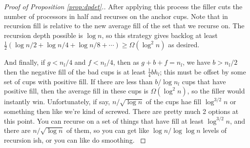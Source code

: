 \documentclass{article}[11pt]
\begin{document}
\begin{proof}[Proof of Proposition \ref{prop:dpdet}.]
  After applying this process the filler cuts the number of processors in half
  and recurses on the anchor cups. Note that in recursion fill is relative to
  the new average fill of the set that we recurse on. The recursion depth
  possible is $\log n$, so this strategy gives backlog at least
  $\frac{1}{2}(\log n/2 + \log n/4 + \log n/8 + \cdots) \ge \Omega(\log^2 n)$
  as desired.
  
  {\color{red}
  And finally, if $g<n_l/4$ and $f<n_l/4$, then as $g+b+f = n_l$, we have $b >
  n_l/2$ then the negative fill of the bad cups is at least $\frac{1}{4}b h_l$;
  this must be offset by some set of cups with positive fill.  If there are
  less than $b/\log n_l$ cups that have positive fill, then the average fill in
  these cups is $\Omega(\log^2 n)$, so the filler would instantly win.
  Unfortunately, if say, $n/\sqrt{\log n}$ of the cups hae fill $\log^{3/2} n$
  or something then like we're kind of screwed. There are pretty much 2 options
  at this point. You can recurse on a set of things that have fill at least
  $\log^{3/2} n$, and there are $n/\sqrt{\log n}$ of them, so you can get like
  $\log n / \log \log n$ levels of recursion ish, or you can like do smoothing.
}

\end{proof}
\end{document}
